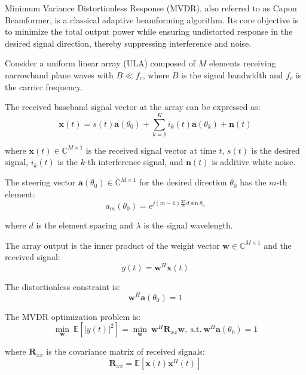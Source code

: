 \documentclass[journal]{IEEEtran}
\begin{document}
Minimum Variance Distortionless Response (MVDR), also referred to as Capon Beamformer, is a classical adaptive beamforming algorithm. Its core objective is to minimize the total output power while ensuring undistorted response in the desired signal direction, thereby suppressing interference and noise.

Consider a uniform linear array (ULA) composed of $M$ elements receiving narrowband plane waves with $B \ll f_c$, where $B$ is the signal bandwidth and $f_c$ is the carrier frequency.

The received baseband signal vector at the array can be expressed as:
\begin{equation}
\boldsymbol{x}(t) = s(t)\boldsymbol{a}(\theta_0) + \sum_{k=1}^{K} i_k(t)\boldsymbol{a}(\theta_k) + \boldsymbol{n}(t)
\end{equation}

where $\boldsymbol{x}(t) \in \mathbb{C}^{M \times 1}$ is the received signal vector at time $t$, $s(t)$ is the desired signal, $i_k(t)$ is the $k$-th interference signal, and $\boldsymbol{n}(t)$ is additive white noise.

The steering vector $\boldsymbol{a}(\theta_0) \in \mathbb{C}^{M \times 1}$ for the desired direction $\theta_0$ has the $m$-th element:
\begin{equation}
a_{m}(\theta_{0}) = e^{j(m-1)\frac{2\pi}{\lambda}d\sin\theta_{0}}
\end{equation}

where $d$ is the element spacing and $\lambda$ is the signal wavelength.

The array output is the inner product of the weight vector $\boldsymbol{w} \in \mathbb{C}^{M \times 1}$ and the received signal:
\begin{equation}
y(t) = \boldsymbol{w}^H \boldsymbol{x}(t)
\end{equation}

The distortionless constraint is:
\begin{equation}
\boldsymbol{w}^H \boldsymbol{a}(\theta_0) = 1
\end{equation}

The MVDR optimization problem is:
\begin{equation}
\min_{\boldsymbol{w}} \ \mathbb{E}\left[|y(t)|^2\right] = \min_{\boldsymbol{w}} \ \boldsymbol{w}^H \boldsymbol{R}_{xx} \boldsymbol{w},\ \text{s.t.}\ \boldsymbol{w}^H \boldsymbol{a}(\theta_0) = 1
\end{equation}

where $\boldsymbol{R}_{xx}$ is the covariance matrix of received signals:
\begin{equation}
\boldsymbol{R}_{xx} = \mathbb{E}\left[\boldsymbol{x}(t)\boldsymbol{x}^H(t)\right]
\end{equation}
\end{document}
